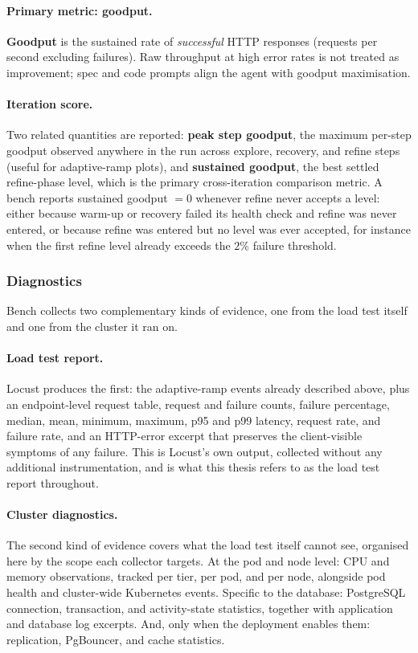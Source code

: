 \paragraph{Primary metric: goodput.}
\textbf{Goodput} is the sustained rate of \emph{successful} HTTP responses
(requests per second excluding failures).  Raw throughput at high error rates
is not treated as improvement; spec and code prompts align the agent with
goodput maximisation.

\paragraph{Iteration score.}
Two related quantities are reported: \textbf{peak step goodput}, the
maximum per-step goodput observed anywhere in the run across explore,
recovery, and refine steps (useful for adaptive-ramp plots), and
\textbf{sustained goodput}, the best settled refine-phase level, which is
the primary cross-iteration comparison metric. A bench reports sustained
goodput $=0$ whenever refine never accepts a level: either because warm-up
or recovery failed its health check and refine was never entered, or
because refine was entered but no level was ever accepted, for instance
when the first refine level already exceeds the $2\%$ failure threshold.

\subsubsection{Diagnostics}

Bench collects two complementary kinds of evidence, one from the load
test itself and one from the cluster it ran on.

\paragraph{Load test report.}
Locust produces the first: the adaptive-ramp events already described
above, plus an endpoint-level request table, request and failure counts,
failure percentage, median, mean, minimum, maximum, p95 and p99 latency,
request rate, and failure rate, and an HTTP-error excerpt that preserves
the client-visible symptoms of any failure. This is Locust's own output,
collected without any additional instrumentation, and is what this
thesis refers to as the load test report throughout.

\paragraph{Cluster diagnostics.}
The second kind of evidence covers what the load test itself cannot see,
organised here by the scope each collector targets. At the pod and node
level: CPU and memory observations, tracked per tier, per pod, and per
node, alongside pod health and cluster-wide Kubernetes events. Specific
to the database: PostgreSQL connection, transaction, and
activity-state statistics, together with application and database log
excerpts. And, only when the deployment enables them: replication,
PgBouncer, and cache statistics.

